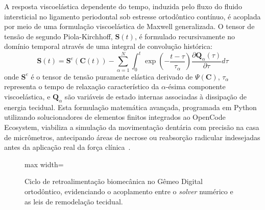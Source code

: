 A resposta viscoelástica dependente do tempo, induzida pelo fluxo do fluido intersticial no ligamento periodontal sob estresse ortodôntico contínuo, é acoplada por meio de uma formulação viscoelástica de Maxwell generalizada. O tensor de tensão de segundo Piola-Kirchhoff, $\bm{S}(t)$, é formulado recursivamente no domínio temporal através de uma integral de convolução histórica:
\begin{equation}
    \bm{S}(t) = \bm{S}^{e}(\bm{C}(t)) - \sum_{\alpha=1}^N \int_0^t \exp\left( - \frac{t - \tau}{\tau_{\alpha}} \right) \frac{\partial \bm{Q}_{\alpha}(\tau)}{\partial \tau} d\tau
\end{equation}
onde $\bm{S}^{e}$ é o tensor de tensão puramente elástica derivado de $\Psi(\bm{C})$, $\tau_{\alpha}$ representa o tempo de relaxação característico da $\alpha$-ésima componente viscoelástica, e $\bm{Q}_{\alpha}$ são variáveis de estado internas associadas à dissipação de energia tecidual. Esta formulação matemática avançada, programada em Python utilizando solucionadores de elementos finitos integrados ao OpenCode Ecosystem, viabiliza a simulação da movimentação dentária com precisão na casa de micrômetros, antecipando áreas de necrose ou reabsorção radicular indesejadas antes da aplicação real da força clínica~\cite{olawade2026advancing}.

\begin{figure}[h!]
    \centering
    \begin{adjustbox}{max width=\textwidth}
\end{adjustbox}
    \caption{Ciclo de retroalimentação biomecânica no Gêmeo Digital ortodôntico, evidenciando o acoplamento entre o \textit{solver} numérico e as leis de remodelação tecidual.}
    \label{fig:biomecanica-orto}
\end{figure}

